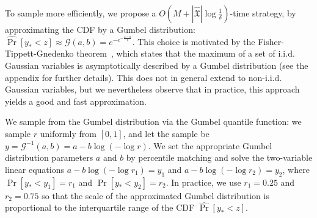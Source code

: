 To sample more efficiently, we propose a $O(M+|\hat{\mathfrak X}|\log \frac{1}{\delta})$-time strategy, by approximating the CDF by a Gumbel distribution: $\widehat{\Pr}[y_* < z]\approx \mathcal G(a,b) = e^{-e^{-\frac{z-a}{b}}}$. This choice is motivated by the Fisher-Tippett-Gnedenko theorem~\cite{fisher1930genetical}, which states that the maximum of a set of i.i.d. Gaussian variables is asymptotically described by a Gumbel distribution (see the appendix for further details). This does not in general extend to non-i.i.d. Gaussian variables, but we nevertheless observe that in practice, this approach yields a good and fast approximation.

We sample from the Gumbel distribution via the Gumbel quantile function: we sample $r$ uniformly from $[0,1]$, and let the sample be $y = \mathcal G^{-1}(a,b) = a-b\log(-\log r)$. We set the appropriate Gumbel distribution parameters $a$ and $b$ by percentile matching and solve the two-variable linear equations $a-b\log(-\log r_1) = y_1$ and $a-b\log(-\log r_2) = y_2$, where $\Pr[{y}_* < y_1]=r_1$ and $\Pr[{y}_* < y_2]=r_2$. In practice, we use $r_1=0.25$ and $r_2=0.75$ so that the scale of the approximated Gumbel distribution
is proportional to the interquartile range of the CDF $\hat{\Pr}[y_* < z]$. %

